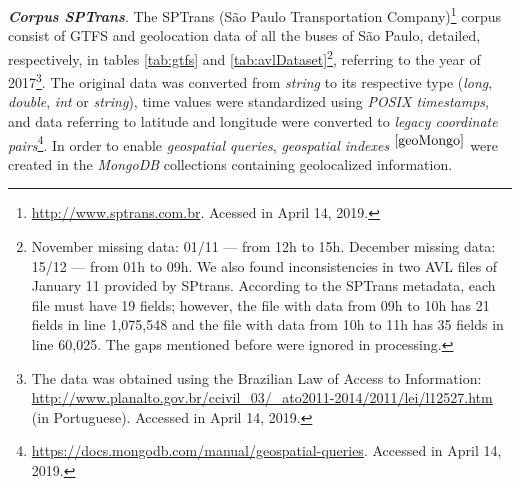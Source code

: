 \documentclass[runningheads]{llncs}
\newcommand{\footref}[1]{%
    $^{\ref{#1}}$%
}
\begin{document}
\textbf{\textit{{Corpus} SPTrans}}. The SPTrans (São Paulo Transportation Company)\footnote{\url{http://www.sptrans.com.br}. Acessed in April 14, 2019.} corpus consist of   GTFS and geolocation data of all the buses of São Paulo, detailed, respectively, in tables \ref{tab:gtfs} and \ref{tab:avlDataset}\footnote{November missing data: 01/11 --- from 12h to 15h. December missing data: 15/12 --- from 01h to 09h. We also found inconsistencies in two AVL files of January 11 provided by SPtrans. According to the SPTrans metadata, each file must have 19 fields; however, the file with data from 09h to 10h has 21 fields in line 1,075,548 and the file with data from 10h to 11h has 35 fields in line 60,025. The gaps mentioned before were ignored in processing.}, referring to the year of 2017\footnote{The data was obtained using the Brazilian Law of Access to Information: \url{http://www.planalto.gov.br/ccivil_03/_ato2011-2014/2011/lei/l12527.htm} (in Portuguese). Accessed in April 14, 2019.}. The original data was converted from \textit{string} to its respective type (\textit{long}, \textit {double}, \textit{int} or \textit{string}), time values were standardized using \textit{POSIX timestamps}, and data referring to latitude and longitude were converted to \textit {legacy coordinate pairs}\footnote {\label{geoMongo}\url {https://docs.mongodb.com/manual/geospatial-queries}. Accessed in April 14, 2019.}. In order to enable \textit{geospatial queries}, \textit{geospatial indexes}\footref{geoMongo} were created in the \textit{MongoDB} collections containing geolocalized information.
\end{document}
